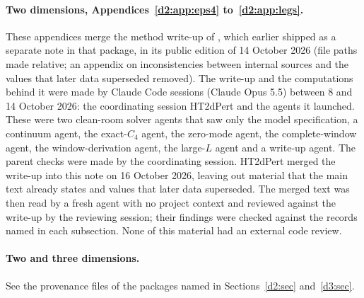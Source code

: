 \paragraph{Two dimensions, Appendices~\ref{d2:app:eps4} to~\ref{d2:app:legs}.} These appendices merge the method
write-up of , which earlier shipped as a separate note in that package, in its
public edition of 14 October 2026 (file paths made relative; an appendix on inconsistencies between internal sources and
the values that later data superseded removed). The
write-up and the computations behind it were made by Claude Code sessions (Claude Opus 5.5) between 8 and 14 October 2026:
the coordinating session HT2dPert and the agents it launched. These were two clean-room solver agents that saw only the
model specification, a continuum agent, the exact-$C_4$ agent, the zero-mode agent, the complete-window agent, the
window-derivation agent, the large-$L$ agent and a write-up agent. The parent checks were made by the coordinating
session. HT2dPert merged the write-up into this note on 16 October 2026, leaving out material that the main text already
states and values that later data superseded. The merged text was then read by a fresh agent with no project context
and reviewed against the write-up by the reviewing session; their findings were checked against the records named in
each subsection. None of this material had an external code review.

\paragraph{Two and three dimensions.} See the provenance files of the packages named in Sections~\ref{d2:sec}
and~\ref{d3:sec}.
